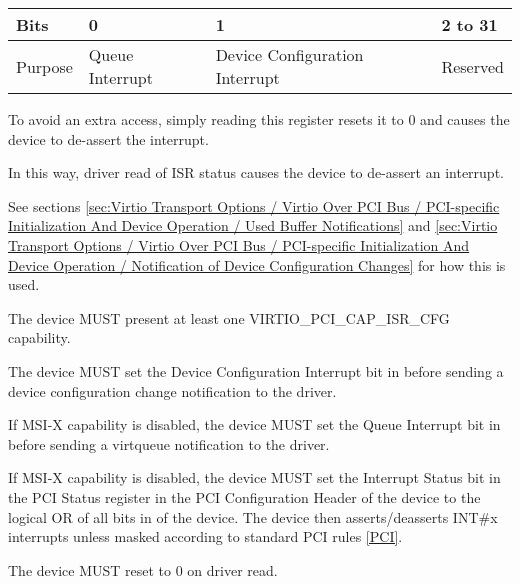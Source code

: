 \begin{tabular}{ |l||l|l|l| }
\hline
Bits       & 0                               & 1               &  2 to 31 \\
\hline
Purpose    & Queue Interrupt  & Device Configuration Interrupt & Reserved \\
\hline
\end{tabular}

To avoid an extra access, simply reading this register resets it to 0 and
causes the device to de-assert the interrupt.

In this way, driver read of ISR status causes the device to de-assert
an interrupt.

See sections \ref{sec:Virtio Transport Options / Virtio Over PCI Bus / PCI-specific Initialization And Device Operation / Used Buffer Notifications} and \ref{sec:Virtio Transport Options / Virtio Over PCI Bus / PCI-specific Initialization And Device Operation / Notification of Device Configuration Changes} for how this is used.


The device MUST present at least one VIRTIO_PCI_CAP_ISR_CFG capability.  

The device MUST set the Device Configuration Interrupt bit
in  before sending a device configuration
change notification to the driver.

If MSI-X capability is disabled, the device MUST set the Queue
Interrupt bit in  before sending a virtqueue
notification to the driver.

If MSI-X capability is disabled, the device MUST set the Interrupt Status
bit in the PCI Status register in the PCI Configuration Header of
the device to the logical OR of all bits in  of
the device.  The device then asserts/deasserts INT\#x interrupts unless masked
according to standard PCI rules \hyperref[intro:PCI]{[PCI]}.

The device MUST reset  to 0 on driver read.


